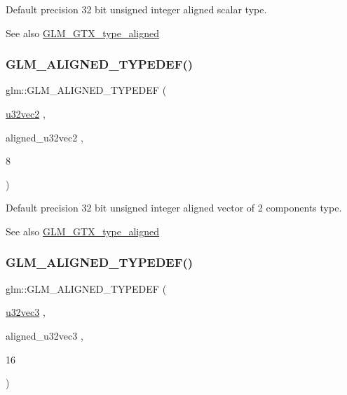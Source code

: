 Default precision 32 bit unsigned integer aligned scalar type. \begin{DoxySeeAlso}{See also}
\mbox{\hyperlink{group__gtx__type__aligned}{G\+L\+M\+\_\+\+G\+T\+X\+\_\+type\+\_\+aligned}} 
\end{DoxySeeAlso}
\mbox{\label{group__gtx__type__aligned_ga1fa0dfc8feb0fa17dab2acd43e05342b}} 
\subsubsection{\texorpdfstring{GLM\_ALIGNED\_TYPEDEF()}{GLM\_ALIGNED\_TYPEDEF()}\hspace{0.1cm}{\footnotesize\ttfamily [130/209]}}
{\footnotesize\ttfamily glm\+::\+G\+L\+M\+\_\+\+A\+L\+I\+G\+N\+E\+D\+\_\+\+T\+Y\+P\+E\+D\+EF (\begin{DoxyParamCaption}\item[{\mbox{\hyperlink{group__gtc__type__precision_gad3a81c0d5a6941bb9ffdc9fa8611b426}{u32vec2}}}]{,  }\item[{aligned\+\_\+u32vec2}]{,  }\item[{8}]{ }\end{DoxyParamCaption})}

Default precision 32 bit unsigned integer aligned vector of 2 components type. \begin{DoxySeeAlso}{See also}
\mbox{\hyperlink{group__gtx__type__aligned}{G\+L\+M\+\_\+\+G\+T\+X\+\_\+type\+\_\+aligned}} 
\end{DoxySeeAlso}
\mbox{\label{group__gtx__type__aligned_ga0019500abbfa9c66eff61ca75eaaed94}} 
\subsubsection{\texorpdfstring{GLM\_ALIGNED\_TYPEDEF()}{GLM\_ALIGNED\_TYPEDEF()}\hspace{0.1cm}{\footnotesize\ttfamily [131/209]}}
{\footnotesize\ttfamily glm\+::\+G\+L\+M\+\_\+\+A\+L\+I\+G\+N\+E\+D\+\_\+\+T\+Y\+P\+E\+D\+EF (\begin{DoxyParamCaption}\item[{\mbox{\hyperlink{group__gtc__type__precision_ga16b26751ba6b83c8a0226b9834d73fdc}{u32vec3}}}]{,  }\item[{aligned\+\_\+u32vec3}]{,  }\item[{16}]{ }\end{DoxyParamCaption})}

